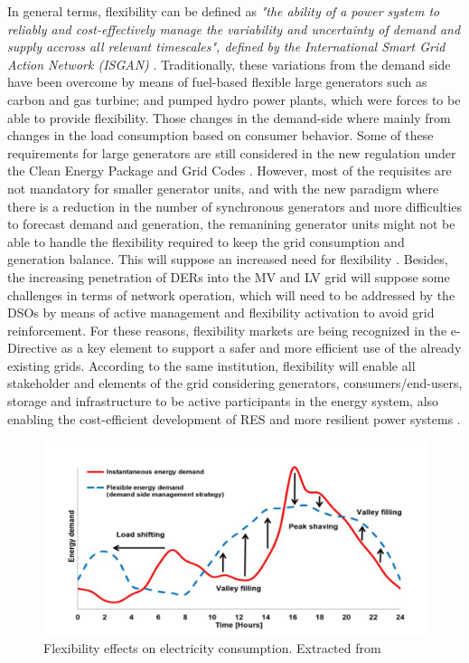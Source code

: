 In general terms, flexibility can be defined as \textit{"the ability of a power system to reliably and cost-effectively manage the variability and uncertainty of demand and supply accross all relevant timescales", defined by the International Smart Grid Action Network (ISGAN)} \cite{Hillberg2019}. Traditionally, these variations from the demand side have been overcome by means of fuel-based flexible large generators such as carbon and gas turbine; and pumped hydro power plants, which were forces to be able to provide flexibility. Those changes in the demand-side where mainly from changes in the load consumption based on consumer behavior.
Some of these requirements for large generators are still considered in the new regulation under the Clean Energy Package and Grid Codes \cite{validzic2017clean}. However, most of the requisites are not mandatory for smaller generator units, and with the new paradigm where there is a reduction in the number of synchronous generators and more difficulties to forecast demand and generation, the remanining generator units might not be able to handle the flexibility required to keep the grid consumption and generation balance. This will suppose an increased need for flexibility \cite{Xu2019}. Besides, the increasing penetration of DERs into the MV and LV grid will suppose some challenges in terms of network operation, which will need to be addressed by the DSOs by means of active management and flexibility activation to avoid grid reinforcement. For these reasons, flexibility markets are being recognized in the e-Directive \cite{Directive2019944} as a key element to support a safer and more efficient use of the already existing grids.
According to the same institution, flexibility will enable all stakeholder and elements of the grid considering generators, consumers/end-users, storage and infrastructure to be active participants in the energy system, also enabling the cost-efficient development of RES and more resilient power systems \cite{Hillberg2019}.  

\begin{figure}[h]
	\centering 
	\includegraphics[width=0.8\columnwidth ]{ChapterIntro/Figures/flex_load_shifting.png}
		\caption{Flexibility effects on electricity consumption. Extracted from \cite{Hillberg2019}}  
		\label{fig:load_shifting}
\end{figure}


